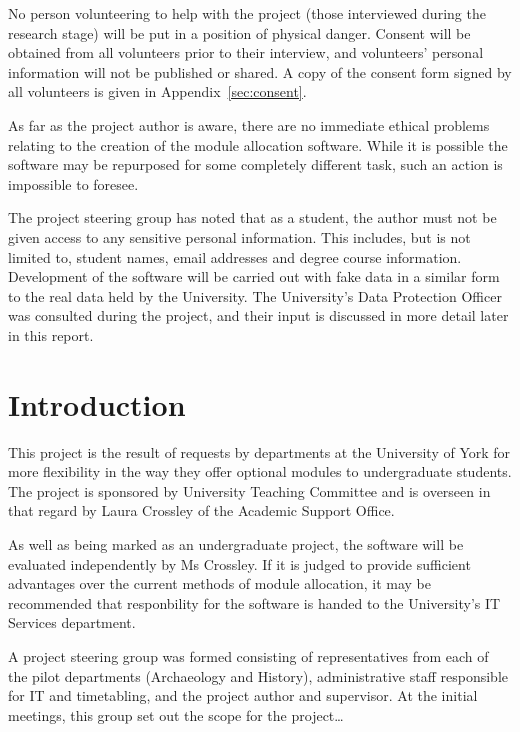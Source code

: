 \documentclass[]{scrartcl}
\begin{document}
No person volunteering to help with the project (those interviewed during the research stage) will be put in a position of physical danger. Consent will be obtained from all volunteers prior to their interview, and volunteers' personal information will not be published or shared. A copy of the consent form signed by all volunteers is given in Appendix~\ref{sec:consent}.

As far as the project author is aware, there are no immediate ethical problems relating to the creation of the module allocation software. While it is possible the software may be repurposed for some completely different task, such an action is impossible to foresee.

The project steering group has noted that as a student, the author must not be given access to any sensitive personal information. This includes, but is not limited to, student names, email addresses and degree course information. Development of the software will be carried out with fake data in a similar form to the real data held by the University. The University's Data Protection Officer was consulted during the project, and their input is discussed in more detail later in this report.

\section{Introduction}


This project is the result of requests by departments at the University of York for more flexibility in the way they offer optional modules to undergraduate students. The project is sponsored by University Teaching Committee and is overseen in that regard by Laura Crossley of the Academic Support Office.

As well as being marked as an undergraduate project, the software will be evaluated independently by Ms Crossley. If it is judged to provide sufficient advantages over the current methods of module allocation, it may be recommended that responbility for the software is handed to the University's IT Services department.

A project steering group was formed consisting of representatives from each of the pilot departments (Archaeology and History), administrative staff responsible for IT and timetabling, and the project author and supervisor. At the initial meetings, this group set out the scope for the project…
\end{document}
